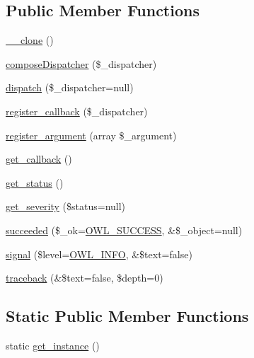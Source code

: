 \subsection*{Public Member Functions}
\begin{DoxyCompactItemize}
\item 
\hyperlink{classDispatcher_a601d9fd6c9a2ccbfd77b43b6f7678ba3}{\_\-\_\-clone} ()
\item 
\hyperlink{classDispatcher_a8a974bbbb30be7cda74f9929972fd2f6}{composeDispatcher} (\$\_\-dispatcher)
\item 
\hyperlink{classDispatcher_a55f3a6e89f797e2986d32166cfa49486}{dispatch} (\$\_\-dispatcher=null)
\item 
\hyperlink{classDispatcher_ab466a55a02d5c40d10da035942d55bd5}{register\_\-callback} (\$\_\-dispatcher)
\item 
\hyperlink{classDispatcher_a1542eebbc07bb9bf848c5cbd90cd437e}{register\_\-argument} (array \$\_\-argument)
\item 
\hyperlink{classDispatcher_af4b71fa3c4d25bab86187d9dc44182f2}{get\_\-callback} ()
\item 
\hyperlink{class__OWL_a99ec771fa2c5c279f80152cc09e489a8}{get\_\-status} ()
\item 
\hyperlink{class__OWL_adf9509ef96858be7bdd9414c5ef129aa}{get\_\-severity} (\$status=null)
\item 
\hyperlink{class__OWL_a53ab4d3bbb2c6a56966c339ca4b4c805}{succeeded} (\$\_\-ok=\hyperlink{owl_8severitycodes_8php_a96223f06ba27bf5cbefa6e9d702897c2}{OWL\_\-SUCCESS}, \&\$\_\-object=null)
\item 
\hyperlink{class__OWL_a51ba4a16409acf2a2f61f286939091a5}{signal} (\$level=\hyperlink{owl_8severitycodes_8php_a139328861128689f2f4def6a399d9057}{OWL\_\-INFO}, \&\$text=false)
\item 
\hyperlink{class__OWL_aa29547995d6741b7d2b90c1d4ea99a13}{traceback} (\&\$text=false, \$depth=0)
\end{DoxyCompactItemize}
\subsection*{Static Public Member Functions}
\begin{DoxyCompactItemize}
\item 
static \hyperlink{classDispatcher_af9998a41bc9dec229b58924e9d5e5e6a}{get\_\-instance} ()
\end{DoxyCompactItemize}

